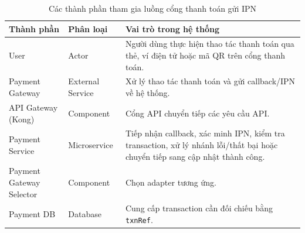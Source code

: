 
\begin{table}[H]
\centering
\renewcommand{\arraystretch}{1.3}

\begin{tabular}{|l|l|p{5cm}|}
\hline
\textbf{Thành phần} & \textbf{Phân loại} & \textbf{Vai trò trong hệ thống} \\ \hline
User & Actor & Người dùng thực hiện thao tác thanh toán qua thẻ, ví điện tử hoặc mã QR trên cổng thanh toán. \\ \hline
Payment Gateway & External Service & Xử lý thao tác thanh toán và gửi callback/IPN về hệ thống. \\ \hline
API Gateway (Kong) & Component & Cổng API chuyển tiếp các yêu cầu API. \\ \hline
Payment Service & Microservice & Tiếp nhận callback, xác minh IPN, kiểm tra transaction, xử lý nhánh lỗi/thất bại hoặc chuyển tiếp sang cập nhật thành công. \\ \hline
Payment Gateway Selector & Component & Chọn adapter tương ứng. \\ \hline
Payment DB & Database & Cung cấp transaction cần đối chiếu bằng \texttt{txnRef}. \\ \hline
\end{tabular}
\caption{Các thành phần tham gia luồng cổng thanh toán gửi IPN}
\end{table}
